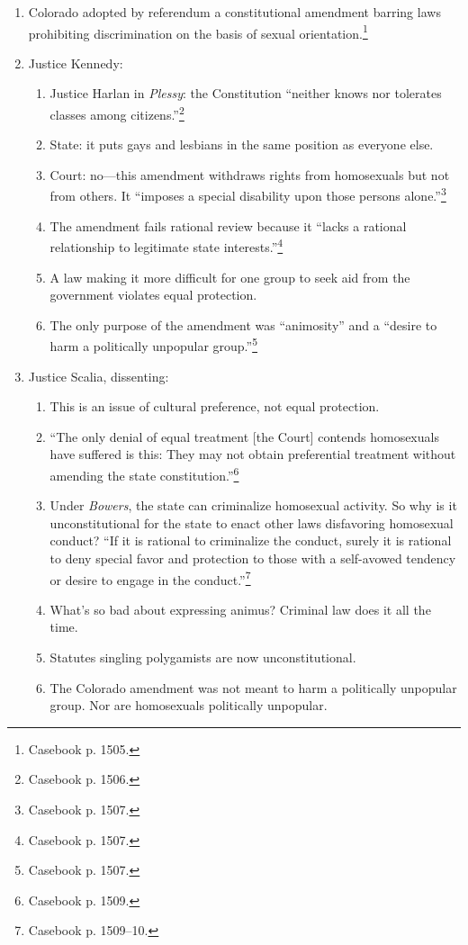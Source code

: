 \begin{enumerate}
    \item Colorado adopted by referendum a constitutional amendment barring 
    laws prohibiting discrimination on the basis of sexual 
    orientation.\footnote{Casebook p. 1505.}
    \item Justice Kennedy:
    \begin{enumerate}
        \item Justice Harlan in \emph{Plessy}: the Constitution ``neither 
        knows nor tolerates classes among citizens.''\footnote{Casebook p. 
        1506.}
        \item State: it puts gays and lesbians in the same position as 
        everyone else.
        \item Court: no---this amendment withdraws rights from homosexuals 
        but not from others. It ``imposes a special disability upon those 
        persons alone.''\footnote{Casebook p. 1507.}
        \item The amendment fails rational review because it ``lacks a 
        rational relationship to legitimate state 
        interests.''\footnote{Casebook p. 1507.}
        \item A law making it more difficult for one group to seek aid from 
        the government violates equal protection.
        \item The only purpose of the amendment was ``animosity'' and a 
        ``desire to harm a politically unpopular group.''\footnote{Casebook p. 
        1507.}
    \end{enumerate}
    \item Justice Scalia, dissenting:
    \begin{enumerate}
        \item This is an issue of cultural preference, not equal protection.
        \item ``The only denial of equal treatment [the Court] contends 
        homosexuals have suffered is this: They may not obtain preferential 
        treatment without amending the state constitution.''\footnote{Casebook 
        p. 1509.}
        \item Under \emph{Bowers}, the state can criminalize homosexual 
        activity. So why is it unconstitutional for the state to enact other 
        laws disfavoring homosexual conduct? ``If it is rational to 
        criminalize the conduct, surely it is rational to deny special favor 
        and protection to those with a self-avowed tendency or desire to 
        engage in the conduct.''\footnote{Casebook p. 1509--10.}
        \item What's so bad about expressing animus? Criminal law does it all 
        the time.
        \item Statutes singling polygamists are now unconstitutional.
        \item The Colorado amendment was not meant to harm a politically 
        unpopular group. Nor are homosexuals politically unpopular.
    \end{enumerate}
\end{enumerate}
 

